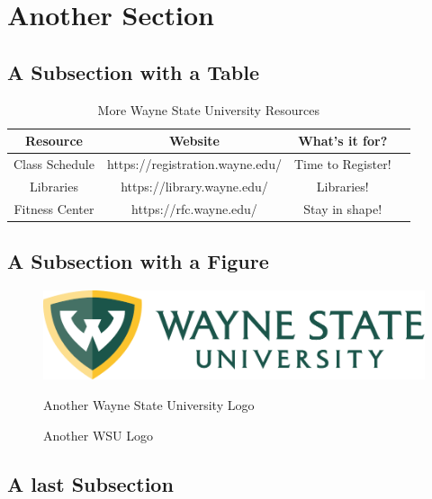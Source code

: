 \section{Another Section}
\label{chap:Related Work}

\subsection{A Subsection with a Table}

\begin{table}[!h]
    \centering	
    \bgroup
    \def\arraystretch{1.00}
    \begin{tabular}{| c | c | c | c |}
          \hline			
          Resource & Website & What's it for? \\ \hline \hline \cline{1-3}
          Class Schedule & https://registration.wayne.edu/ & Time to Register! \\ \hline
          Libraries & https://library.wayne.edu/ & Libraries!\\ \hline
          Fitness Center & https://rfc.wayne.edu/ & Stay in shape!\\ \hline
    \end{tabular}
    \egroup
    \caption{More Wayne State University Resources}
    \label{tab:WSUresources2}
\end{table}

\subsection{A Subsection with a Figure}

\begin{figure}[!htbp]
    \centering
    \includegraphics[width=0.50\linewidth]{fig/wsu_primary_horz_color.pdf}
    \caption{Another WSU Logo} Another Wayne State University Logo
    \label{fig:WSUlogo}
\end{figure}

\subsection{A last Subsection}
